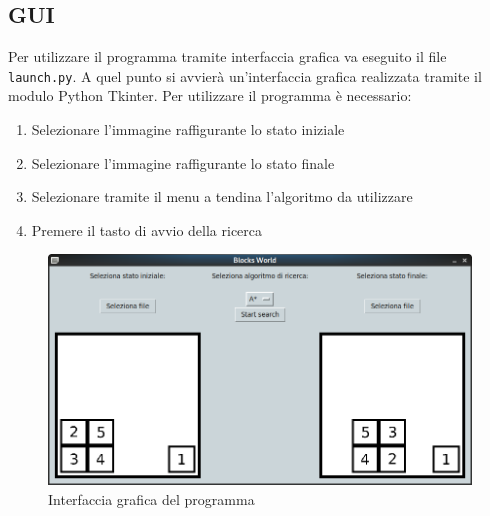 \documentclass{article}
\begin{document}
	\subsection{GUI}
	Per utilizzare il programma tramite interfaccia grafica va eseguito il file \verb*|launch.py|. A quel punto si avvierà un'interfaccia grafica realizzata tramite il modulo Python Tkinter. Per utilizzare il programma è necessario:
	\begin{enumerate}
		\item Selezionare l'immagine raffigurante lo stato iniziale
		\item Selezionare l'immagine raffigurante lo stato finale
		\item Selezionare tramite il menu a tendina l'algoritmo da utilizzare
		\item Premere il tasto di avvio della ricerca
	\end{enumerate}
	\begin{figure}[H]
		\centering
		\includegraphics[width=12cm]{./images/gui.png}
		\caption{Interfaccia grafica del programma}
	\end{figure}
	
\end{document}
